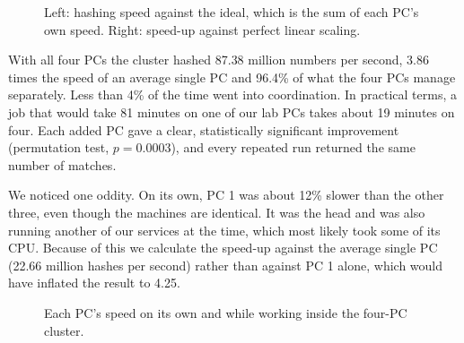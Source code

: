 \documentclass[11pt,a4paper]{article}
\begin{document}
\begin{figure}[H]\centering
{}\hfill
{}
\caption{Left: hashing speed against the ideal, which is the sum of each PC's own speed. Right: speed-up against perfect linear scaling.}
\label{fig:scale}
\end{figure}

With all four PCs the cluster hashed 87.38 million numbers per second, 3.86 times the speed of an average single PC and 96.4\% of what the four PCs manage separately. Less than 4\% of the time went into coordination. In practical terms, a job that would take 81 minutes on one of our lab PCs takes about 19 minutes on four. Each added PC gave a clear, statistically significant improvement (permutation test, $p = 0.0003$), and every repeated run returned the same number of matches.

We noticed one oddity. On its own, PC 1 was about 12\% slower than the other three, even though the machines are identical. It was the head and was also running another of our services at the time, which most likely took some of its CPU. Because of this we calculate the speed-up against the average single PC (22.66 million hashes per second) rather than against PC 1 alone, which would have inflated the result to 4.25.

\begin{figure}[H]\centering
{}
\caption{Each PC's speed on its own and while working inside the four-PC cluster.}
\label{fig:perpc}
\end{figure}
\end{document}
